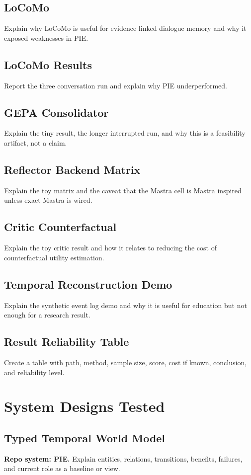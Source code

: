 \documentclass[11pt]{article}
\begin{document}
\subsection{LoCoMo}
Explain why LoCoMo is useful for evidence linked dialogue memory and why it exposed weaknesses in PIE.

\subsection{LoCoMo Results}
Report the three conversation run and explain why PIE underperformed.

\subsection{GEPA Consolidator}
Explain the tiny result, the longer interrupted run, and why this is a feasibility artifact, not a claim.

\subsection{Reflector Backend Matrix}
Explain the toy matrix and the caveat that the Mastra cell is Mastra inspired unless exact Mastra is wired.

\subsection{Critic Counterfactual}
Explain the toy critic result and how it relates to reducing the cost of counterfactual utility estimation.

\subsection{Temporal Reconstruction Demo}
Explain the synthetic event log demo and why it is useful for education but not enough for a research result.

\subsection{Result Reliability Table}
Create a table with path, method, sample size, score, cost if known, conclusion, and reliability level.

\section{System Designs Tested}

\subsection{Typed Temporal World Model}
\textbf{Repo system: PIE.} Explain entities, relations, transitions, benefits, failures, and current role as a baseline or view.
\end{document}
